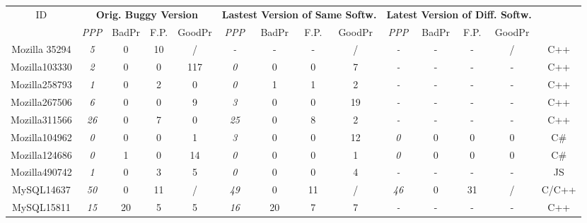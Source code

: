 \begin{table*}[tb!]
\center
\begin{adjustwidth}{-.75in}{-.75in}
{\scriptsize
\begin{tabular}{cccccccccccccc}
\toprule
ID	    & \multicolumn{4}{c}{\bf Orig. Buggy Version} & \multicolumn{4}{c}{\bf Lastest Version of Same Softw.} & \multicolumn{4}{c}{\bf Latest Version of Diff. Softw.}& \\
\cmidrule(lr){2-5}
\cmidrule(lr){6-9}
\cmidrule(lr){10-13}
	       & {\it PPP}    &BadPr & F.P.&GoodPr  &  {\it PPP}   &BadPr & F.P.&GoodPr  & {\it PPP}   &BadPr & F.P.&GoodPr  & \\
\midrule
Mozilla 35294  & {\it  5}     & 0      & 10     & /      & {\it - }     & -      & -      & /      & {\it -  }    & -      & -      & /      & C++	\\ 
Mozilla103330  & {\it  2}     & 0      & 0      & 117    & {\it 0 }     & 0      & 0      & 7      & {\it -  }    & -      & -      & -      & C++	\\ 
Mozilla258793  & {\it  1}     & 0      & 2      & 0      & {\it 0 }     & 1      & 1      & 2      & {\it -  }    & -      & -      & -      & C++	\\
Mozilla267506  & {\it  6}     & 0      & 0      & 9      & {\it 3 }     & 0      & 0      & 19     & {\it -  }    & -      & -      & -      & C++	\\
Mozilla311566  & {\it 26}     & 0      & 7      & 0      & {\it 25}     & 0      & 8      & 2      & {\it -  }    & -      & -      & -      & C++	\\
Mozilla104962  & {\it  0}     & 0      & 0      & 1      & {\it 3 }     & 0      & 0      & 12     & {\it 0  }    & 0      & 0      & 0      & C\#	\\
Mozilla124686  & {\it  0}     & 1      & 0      & 14     & {\it 0 }     & 0      & 0      & 1      & {\it 0  }    & 0      & 0      & 0      & C\#	\\ 
Mozilla490742  & {\it  1}     & 0      & 3      & 5      & {\it 0 }     & 0      & 0      & 4      & {\it -  }    & -      & -      & -      & JS	\\
\midrule                                                                                                                                         
MySQL14637     & {\it 50}     & 0      & 11     & /      & {\it 49}     & 0      & 11     & /      & {\it 46 }    & 0      & 31     & /      & C/C++	\\
MySQL15811     & {\it 15}     & 20     & 5      & 5      & {\it 16}     & 20     & 7      & 7      & {\it -  }    & -      & -      & -      & C++	\\ 

\end{tabular}}
\end{adjustwidth}
\end{table*}
